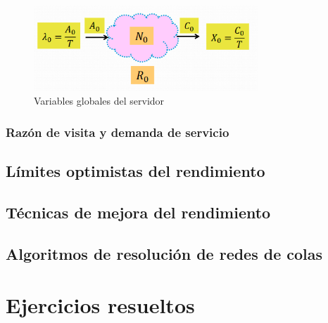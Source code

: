 \documentclass[12pt,spanish]{article}
\begin{document}
\begin{figure}[H]
	\centering
	\includegraphics[width=0.75\textwidth]{varserver.png}
	\caption{Variables globales del servidor}
\end{figure}

\subsubsection{Razón de visita y demanda de servicio}



\subsection{Límites optimistas del rendimiento}

\subsection{Técnicas de mejora del rendimiento}

\subsection{Algoritmos de resolución de redes de colas}























\section{Ejercicios resueltos}

\end{document}

